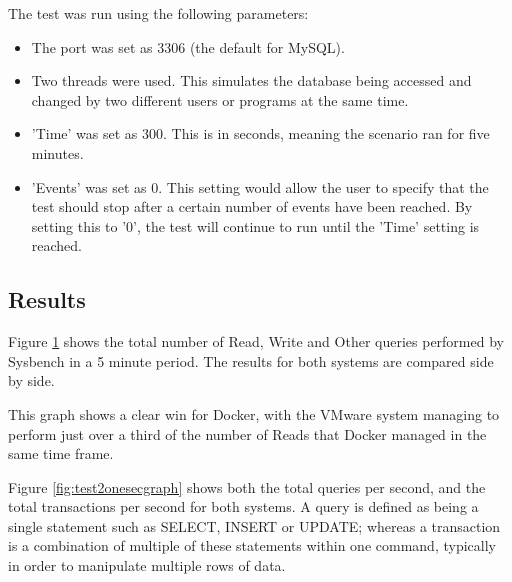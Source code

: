 The test was run using the following parameters:
\begin{itemize}
  \item The port was set as 3306 (the default for MySQL).
  \item Two threads were used. This simulates the database being accessed and changed by two different users or programs at the same time.
  \item 'Time' was set as 300. This is in seconds, meaning the scenario ran for five minutes.
  \item 'Events' was set as 0. This setting would allow the user to specify that the test should stop after a certain number of events have been reached. By setting this to '0', the test will continue to run until the 'Time' setting is reached.
\end{itemize}
\subsection{Results}
\label{test2results}

Figure \ref{fig:test2fiveminutes} shows the total number of Read, Write and Other queries performed by Sysbench in a 5 minute period. The results for both systems are compared side by side.

This graph shows a clear win for Docker, with the VMware system managing to perform just over a third of the number of Reads that Docker managed in the same time frame.

\begin{figure}[H]
\caption{}
\label{fig:test2fiveminutes}
\centering
\end{figure}

Figure \ref{fig:test2onesecgraph} shows both the total queries per second, and the total transactions per second for both systems. A query is defined as being a single statement such as SELECT, INSERT or UPDATE\citep{mysqlqueries}; whereas a transaction is a combination of multiple of these statements within one command\citep{mysqltransactions}, typically in order to manipulate multiple rows of data.


